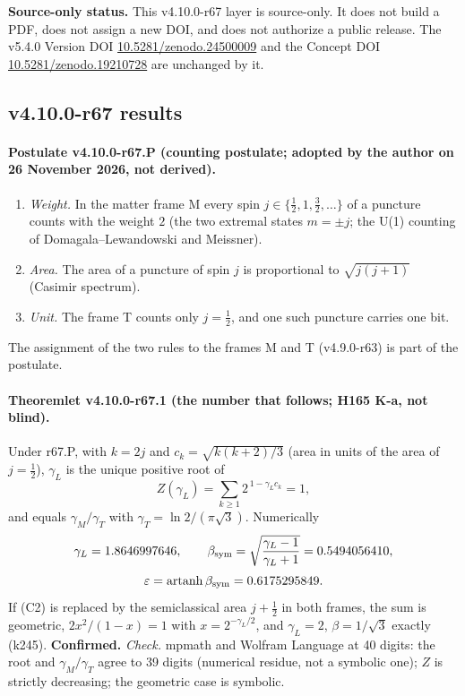 \noindent\textbf{Source-only status.}
This v4.10.0-r67 layer is source-only.  It does not build a PDF, does not assign a new DOI,
and does not authorize a public release.  The v5.4.0 Version DOI
\href{https://doi.org/10.5281/zenodo.24500009}{10.5281/zenodo.24500009} and the Concept DOI
\href{https://doi.org/10.5281/zenodo.19210728}{10.5281/zenodo.19210728} are unchanged by it.

\subsection*{v4.10.0-r67 results}
\label{subsec:v4100-r67-results}

\paragraph{Postulate v4.10.0-r67.P (counting postulate; adopted by the author on 26 November 2026, not derived).}
\begin{enumerate}[leftmargin=2em]
\item[(C1)] \emph{Weight.}  In the matter frame M every spin \(j\in\{\tfrac12,1,\tfrac32,\dots\}\) of a puncture counts with the weight \(2\) (the two
extremal states \(m=\pm j\); the U(1) counting of Domagala--Lewandowski and Meissner).
\item[(C2)] \emph{Area.}  The area of a puncture of spin \(j\) is proportional to \(\sqrt{j(j+1)}\) (Casimir spectrum).
\item[(C3)] \emph{Unit.}  The frame T counts only \(j=\tfrac12\), and one such puncture carries one bit.
\end{enumerate}
The assignment of the two rules to the frames M and T (v4.9.0-r63) is part of the postulate.

\paragraph{Theoremlet v4.10.0-r67.1 (the number that follows; H165 K-a, not blind).}
Under r67.P, with \(k=2j\) and \(c_k=\sqrt{k(k+2)/3}\) (area in units of the area of \(j=\tfrac12\)), \(\gamma_L\) is the unique positive root of
\[
Z(\gamma_L)=\sum_{k\ge1}2^{\,1-\gamma_L c_k}=1 ,
\]
and equals \(\gamma_M/\gamma_T\) with \(\gamma_T=\ln2/(\pi\sqrt3)\).  Numerically
\[
\gamma_L=1.8646997646,\qquad
\beta_{\rm sym}=\sqrt{\frac{\gamma_L-1}{\gamma_L+1}}=0.5494056410,
\]
\[
\varepsilon=\operatorname{artanh}\beta_{\rm sym}=0.6175295849 .
\]
If (C2) is replaced by the semiclassical area \(j+\tfrac12\) in both frames, the sum is geometric, \(2x^2/(1-x)=1\) with \(x=2^{-\gamma_L/2}\), and
\(\gamma_L=2\), \(\beta=1/\sqrt3\) exactly (k245).  \textbf{Confirmed.}
\emph{Check.} mpmath and Wolfram Language at 40 digits: the root and \(\gamma_M/\gamma_T\) agree to 39 digits (numerical residue, not a symbolic
one); \(Z\) is strictly decreasing; the geometric case is symbolic.


